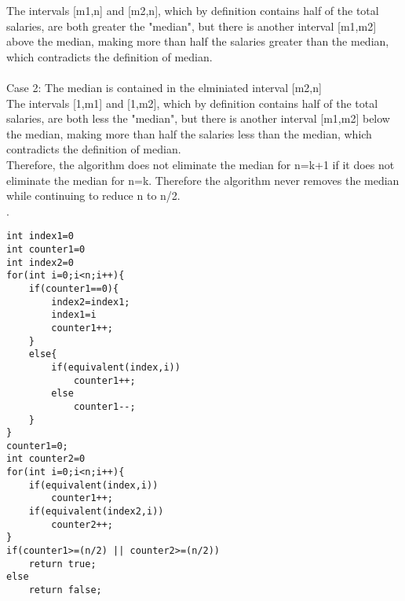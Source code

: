 \documentclass[a4paper,12pt]{article}
\begin{document}
The intervals [m1,n] and [m2,n], which by definition contains half of the total salaries, are both greater the "median", but there is another interval [m1,m2] above the median, making more than half the salaries greater than the median, which contradicts the definition of median.\\\\
Case 2: The median is contained in the elminiated interval [m2,n]\\
The intervals [1,m1] and [1,m2], which by definition contains half of the total salaries, are both less the "median", but there is another interval [m1,m2] below the median, making more than half the salaries less than the median, which contradicts the definition of median.\\

Therefore, the algorithm does not eliminate the median for n=k+1 if it does not eliminate the median for n=k. Therefore the algorithm never removes the median while continuing to reduce n to n/2. \\


. 
\begin{lstlisting} 
int index1=0
int counter1=0
int index2=0
for(int i=0;i<n;i++){
	if(counter1==0){
		index2=index1;
		index1=i
		counter1++;
	}
	else{
		if(equivalent(index,i))
			counter1++;
		else
			counter1--;
	}
}
counter1=0;
int counter2=0
for(int i=0;i<n;i++){
	if(equivalent(index,i))
		counter1++;
	if(equivalent(index2,i))
		counter2++;
}
if(counter1>=(n/2) || counter2>=(n/2))
	return true;
else
	return false;
\end{lstlisting}
\end{document}
